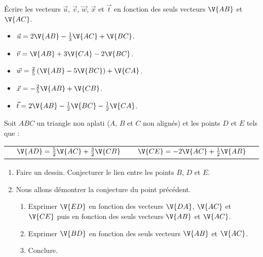 

\begin{exo}
\'Ecrire les vecteurs $\vec{u}$, $\vec{v}$, $\vec{w}$, $\vec{x}$ et $\vec{t}$ en fonction des seuls vecteurs $\V{AB}$ et $\V{AC}$.
\vspace{-1em}\begin{multicols}{3}\begin{itemize}
	\item $\vec{u}=2\V{AB}-\frac{1}{3}\V{AC}+\V{BC}$.
	\item $\vec{v}=\V{AB}+3\V{CA}-2\V{BC}$.
	\item $\vec{w}=\frac{2}{5}\left(\V{AB}-5\V{BC}\right)+\V{CA}$.
	\item $\vec{x}=-\frac{2}{5}\V{AB}+\V{CB}$.
	\item $\vec{t}=2\V{AB}-\frac{1}{2}\V{BC}-\frac{1}{2}\V{CA}$.
\end{itemize}\end{multicols}
\end{exo}

\sautpage

\begin{exo}
Soit $ABC$ un triangle non aplati ($A$, $B$ et $C$ non alignés) et les points $D$ et $E$ tels que :\\
\begin{tabularx}{\linewidth}{XrXlX}
&$\V{AD}=\frac{5}{2}\V{AC}+\frac{3}{2}\V{CB}$ & &$\V{CE}=-2\V{AC}+\frac{1}{2}\V{AB}$&
\end{tabularx}
\begin{enumerate}
	\item Faire un dessin. Conjecturer le lien entre les points $B$, $D$ et $E$.
        \item Nous allons d\'emontrer la conjecture du point pr\'ec\'edent.
	\begin{enumerate}
	 \item Exprimer $\V{ED}$ en fonction des vecteurs $\V{DA}$, $\V{AC}$ et $\V{CE}$ puis en fonction des seuls vecteurs $\V{AB}$ et $\V{AC}$.
	 \item Exprimer $\V{BD}$ en fonction des seuls vecteurs $\V{AB}$ et $\V{AC}$.
	 \item Conclure.
	\end{enumerate}
\end{enumerate}
\end{exo}

